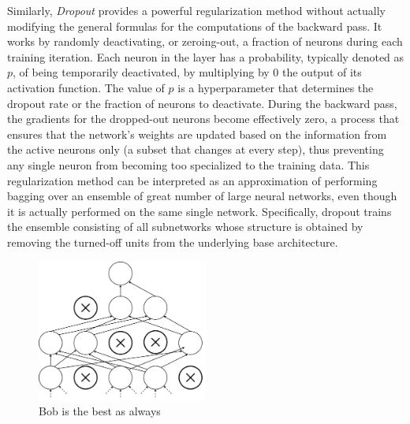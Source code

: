 \documentclass[binding=0.7cm, oneside]{sapthesis}
\begin{document}
Similarly, \emph{Dropout} \cite{dropoput} provides a powerful regularization method without actually modifying the general formulas for the computations of the backward pass.
It works by randomly deactivating, or zeroing-out, a fraction of neurons during each training iteration. Each neuron in the layer has a probability, typically denoted as $p$,
of being temporarily deactivated, by multiplying by 0 the output of its activation function. The value of $p$ is a hyperparameter that determines the dropout rate or the fraction
of neurons to deactivate. During the backward pass, the gradients for the dropped-out neurons become effectively zero, a process that ensures that the network's weights are updated
based on the information from the active neurons only (a subset that changes at every step), thus preventing any single neuron from becoming too specialized to the training data.
This regularization method can be interpreted as an approximation of performing bagging over an ensemble of great number of large neural networks, even though it is actually performed
on the same single network. Specifically, dropout trains the ensemble consisting of all subnetworks whose structure is obtained by removing the turned-off units from the underlying base architecture.
\begin{figure}[h]
    \centering
    \includegraphics[width=0.5\textwidth]{images/dropout.png}
    \caption{Bob is the best as always}
    \label{fig:dropout}
\end{figure}





\end{document}

